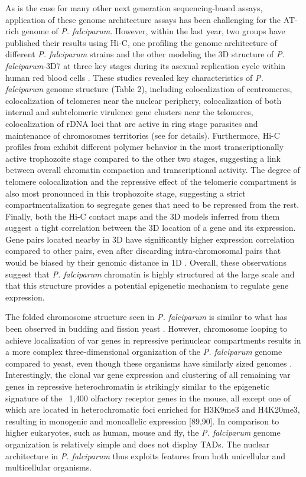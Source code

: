 As is the case for many other next generation sequencing-based assays,
application of these genome architecture assays has been challenging for the
AT-rich genome of \textit{P. falciparum}. However, within the last year, two groups
have published their results using Hi-C, one profiling the genome architecture
of different \textit{P. falciparum} strains \citep{lemieux:genome-wide} 
and the other modeling the 3D
structure of \textit{P. falciparum}-3D7 at three key stages during its asexual
replication cycle within human red blood cells \citep{ay:three-dimensional}.
These studies revealed
key characteristics of \textit{P. falciparum} genome structure (Table 2), including
colocalization of centromeres, colocalization of telomeres near the nuclear
periphery, colocalization of both internal and subtelomeric virulence gene
clusters near the telomeres, colocalization of rDNA loci that are active in
ring stage parasites and maintenance of chromosomes territories (see
\citet{ay:three-dimensional} for details). Furthermore, Hi-C profiles from
\citet{ay:three-dimensional} exhibit different
polymer behavior in the most transcriptionally active trophozoite stage
compared to the other two stages, suggesting a link between overall chromatin
compaction and transcriptional activity. The degree of telomere colocalization
and the repressive effect of the telomeric compartment is also most pronounced
in this trophozoite stage, suggesting a strict compartmentalization to
segregate genes that need to be repressed from the rest. Finally, both the
Hi-C contact maps and the 3D models inferred from them suggest a tight
correlation between the 3D location of a gene and its expression. Gene pairs
located nearby in 3D have significantly higher expression correlation compared
to other pairs, even after discarding intra-chromosomal pairs that would be
biased by their genomic distance in 1D \citep{ay:three-dimensional}. Overall, these observations
suggest that \textit{P. falciparum} chromatin is highly structured at the large scale
and that this structure provides a potential epigenetic mechanism to regulate
gene expression.

The folded chromosome structure seen in \textit{P. falciparum} is similar to what has
been observed in budding and fission yeast \citep{duan:three,
tanizawa:mapping}. However, chromosome
looping to achieve localization of var genes in repressive perinuclear
compartments results in a more complex three-dimensional organization of the
\textit{P. falciparum} genome compared to yeast, even though these organisms have
similarly sized genomes \citep{ay:three-dimensional}.
Interestingly, the clonal var gene expression
and clustering of all remaining var genes in repressive heterochromatin is
strikingly similar to the epigenetic signature of the ~1,400 olfactory
receptor genes in the mouse, all except one of which are located in
heterochromatic foci enriched for H3K9me3 and H4K20me3, resulting in monogenic
and monoallelic expression \citep{magklara:epigenetic, lyons:epigenetic} 
[89,90]. In comparison to higher eukaryotes, such
as human, mouse and fly, the \textit{P. falciparum} genome organization is relatively
simple and does not display TADs. The nuclear architecture in \textit{P.
falciparum}
thus exploits features from both unicellular and multicellular organisms.

